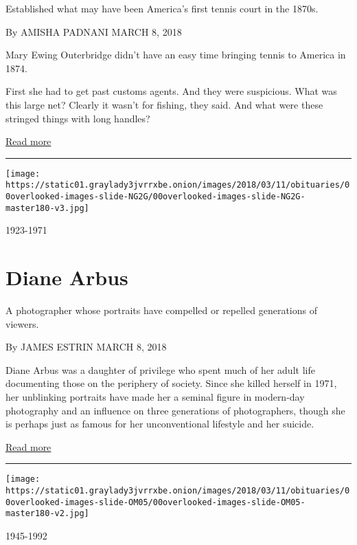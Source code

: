 Established what may have been America's first tennis court in the
1870s.

By AMISHA PADNANI MARCH 8, 2018

Mary Ewing Outerbridge didn't have an easy time bringing tennis to
America in 1874.

First she had to get past customs agents. And they were suspicious. What
was this large net? Clearly it wasn't for fishing, they said. And what
were these stringed things with long handles?

\href{https://www.nytimes3xbfgragh.onion/interactive/2018/obituaries/overlooked-mary-ewing-outerbridge.html}{Read
more}

\begin{center}\rule{0.5\linewidth}{\linethickness}\end{center}

\texttt{[image: https://static01.graylady3jvrrxbe.onion/images/2018/03/11/obituaries/00overlooked-images-slide-NG2G/00overlooked-images-slide-NG2G-master180-v3.jpg]}

1923-1971

\hypertarget{diane-arbus}{%
\section{Diane Arbus}\label{diane-arbus}}

A photographer whose portraits have compelled or repelled generations of
viewers.

By JAMES ESTRIN MARCH 8, 2018

Diane Arbus was a daughter of privilege who spent much of her adult life
documenting those on the periphery of society. Since she killed herself
in 1971, her unblinking portraits have made her a seminal figure in
modern-day photography and an influence on three generations of
photographers, though she is perhaps just as famous for her
unconventional lifestyle and her suicide.

\href{https://www.nytimes3xbfgragh.onion/interactive/2018/obituaries/overlooked-diane-arbus.html}{Read
more}

\begin{center}\rule{0.5\linewidth}{\linethickness}\end{center}

\texttt{[image: https://static01.graylady3jvrrxbe.onion/images/2018/03/11/obituaries/00overlooked-images-slide-OM05/00overlooked-images-slide-OM05-master180-v2.jpg]}

1945-1992

